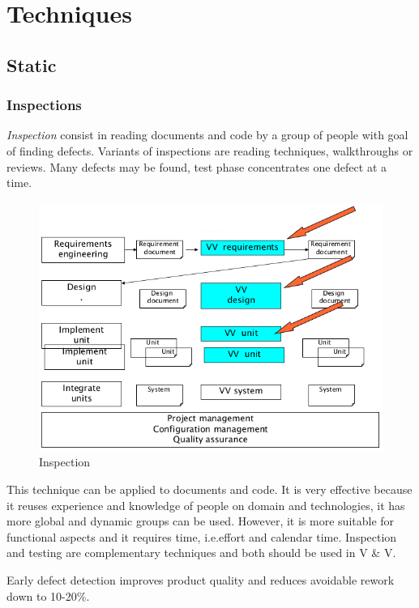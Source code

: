 \section{Techniques}
\subsection{Static}
\subsubsection{Inspections}
\emph{Inspection} consist in reading documents and code by a group of people with goal of finding defects. Variants of inspections are reading techniques, walkthroughs or reviews. Many defects may be found, test phase concentrates one defect at a time.

\begin{figure}[hbtp]
\centering
\includegraphics[scale=0.35]{images/v_v_inspection.png}
\caption{Inspection}
\label{img:v_v_inspection}
\end{figure}

This technique can be applied to documents and code. It is very effective because it reuses experience and knowledge of people on domain and technologies, it has more global and dynamic groups can be used. However, it is more suitable for functional aspects and it requires time, i.e.\@ effort and calendar time. Inspection and testing are complementary techniques and both should be used in V \& V.

Early defect detection improves product quality and reduces avoidable rework down to 10-20\%.


